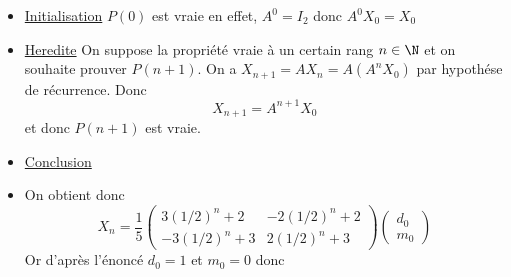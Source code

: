 \documentclass[a4paper, 11pt,reqno]{article}
\begin{document}
\begin{correction}
\begin{enumerate}
\begin{itemize}
\item \underline{Initialisation} 
$P(0)$ est vraie en effet, $A^0 = I_2 $ donc $A^0 X_0 = X_0$

\item \underline{Heredite}
On suppose la propriété vraie à un certain rang $n\in \N$ et on souhaite prouver $P(n+1)$. On a 
$X_{n+1} = AX_n = A (A^n X_0)$ par hypothése de récurrence. 
Donc\\
 $$X_{n+1} =A^{n+1} X_0$$ et donc $P(n+1)$ est  vraie. 
 
 \item \underline{Conclusion}

\item On obtient donc 
$$X_n =\frac{1}{5}\left(\begin{array}{ccc}
3\left( 1/2\right)^n +2 & -2\left( 1/2\right)^n +2\\
-3\left( 1/2\right)^n +3& 2\left( 1/2\right)^n +3
\end{array}
\right) \begin{pmatrix}
d_0\\
m_0
\end{pmatrix}$$
Or d'après l'énoncé $d_0=1$ et $m_0=0$ donc 
\end{itemize}

\end{enumerate}
\end{correction}




\newpage
\end{document}
